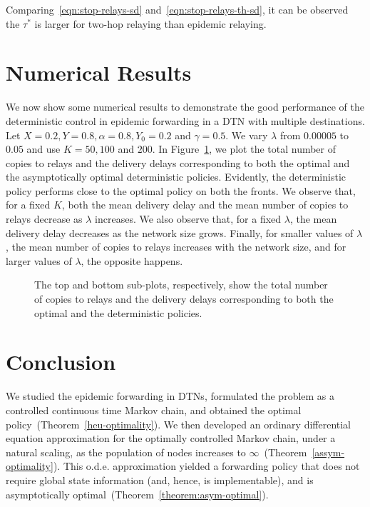 \documentclass[10pt,journal,letterpaper]{IEEEtran}
\begin{document}
{Comparing~\eqref{eqn:stop-relays-sd} and~\eqref{eqn:stop-relays-th-sd}, it
can be observed the $\tau^{\ast}$ is larger for two-hop relaying than
epidemic relaying.
}

\section{Numerical Results}
\label{num-results}
We now show some numerical results to demonstrate the good performance of the deterministic control
in epidemic forwarding in a DTN with multiple destinations.
Let $X = 0.2,Y = 0.8,\alpha = 0.8,Y_0 = 0.2$ and $\gamma = 0.5$.
We vary $\lambda$ from $0.00005$ to $0.05$ and use $K = 50,100$ and $200$.
In Figure~\ref{fig:numerical}, we plot the total number of copies to relays and the delivery delays corresponding
to both the optimal and the  asymptotically optimal deterministic policies.
Evidently, the deterministic policy
performs close to the optimal policy on both the fronts.
We observe that, for a fixed $K$, both the mean delivery delay and the
 mean number of copies to relays decrease as $\lambda$ increases.
We also observe that, for a fixed $\lambda$, the mean delivery delay decreases
as the network size grows.
Finally, for smaller values of $\lambda$, the mean number of copies to relays
increases  with the network size, and for larger values of $\lambda$, the opposite happens.
\begin{figure}[t]
\centering
{}
\caption{The top and bottom sub-plots, respectively, show the total
number of copies to relays and the delivery delays corresponding to
both the optimal and the deterministic policies.}
\label{fig:numerical}
\end{figure}

\section{Conclusion}
We studied the epidemic forwarding in DTNs, formulated the problem as a controlled continuous time Markov chain, and
obtained the optimal policy~(Theorem~\ref{heu-optimality}). We then developed an ordinary differential equation
approximation for the optimally controlled Markov chain, under a natural scaling, as the population of nodes
increases to $\infty$~(Theorem~\ref{assym-optimality}). This o.d.e. approximation yielded a forwarding policy that does not require
global state information (and, hence, is implementable), and is asymptotically optimal~(Theorem~\ref{theorem:asym-optimal}).
\end{document}
